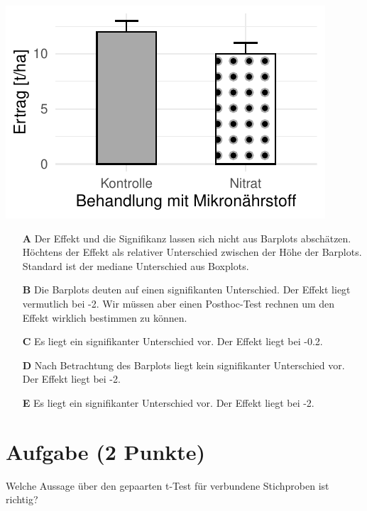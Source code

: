 \documentclass[a4paper, 9pt]{scrartcl}\usepackage[]{graphicx}\usepackage[]{xcolor}
\makeatletter
\def\maxwidth{ %
  \ifdim\Gin@nat@width>\linewidth
    \linewidth
  \else
    \Gin@nat@width
  \fi
}
\makeatother
\begin{document}
{\centering \includegraphics[width=\maxwidth]{img/mc-testing-ttest-02-1} 

}







\begin{enumerate}
\item [\textbf{A} \msquare] Der Effekt und die Signifikanz lassen sich nicht aus Barplots abschätzen. Höchtens der Effekt als relativer Unterschied zwischen der Höhe der Barplots. Standard ist der mediane Unterschied aus Boxplots.
\item [\textbf{B} \msquare] Die Barplots deuten auf einen signifikanten Unterschied. Der Effekt liegt vermutlich bei -2. Wir müssen aber einen Posthoc-Test rechnen um den Effekt wirklich bestimmen zu können.
\item [\textbf{C} \msquare] Es liegt ein signifikanter Unterschied vor. Der Effekt liegt bei -0.2.
\item [\textbf{D} \msquare] Nach Betrachtung des Barplots liegt kein signifikanter Unterschied vor. Der Effekt liegt bei -2.
\item [\textbf{E} \msquare] Es liegt ein signifikanter Unterschied vor. Der Effekt liegt bei -2.
\end{enumerate}

\section{Aufgabe \hfill (2 Punkte)}




Welche Aussage über den gepaarten t-Test für verbundene Stichproben ist richtig?
\end{document}
